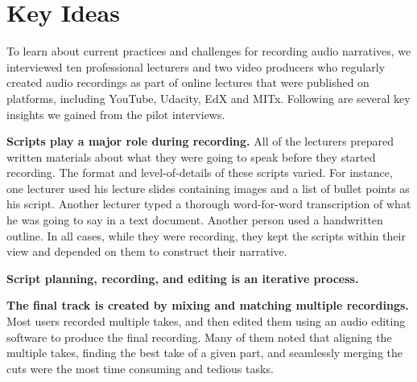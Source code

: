 \section{Key Ideas}

To learn about current practices and challenges for recording audio narratives, we interviewed ten professional lecturers and two video producers who regularly created audio recordings as part of online lectures that were published on platforms, including YouTube, Udacity, EdX and MITx. Following are several key insights we gained from the pilot interviews.

\textbf{Scripts play a major role during recording.} All of the lecturers  prepared written materials about what they were going to speak before they started recording. The format and level-of-details of these scripts varied. For instance, one lecturer used his lecture slides containing images and a list of bullet points as his script. Another lecturer typed a thorough word-for-word transcription of what he was going to say  in a text document.
Another person used a handwritten outline. In all cases, while they were recording, they kept the scripts within their view and depended on them to construct their narrative.  

\textbf{Script planning, recording, and editing is an iterative process.} 

\textbf{The final track is created by mixing and matching multiple recordings.} Most users recorded multiple takes, and then edited them using an audio editing software to produce the final recording. Many of them noted that aligning the multiple takes, finding the best take of a given part, and seamlessly merging the cuts were the most time consuming and tedious tasks.



